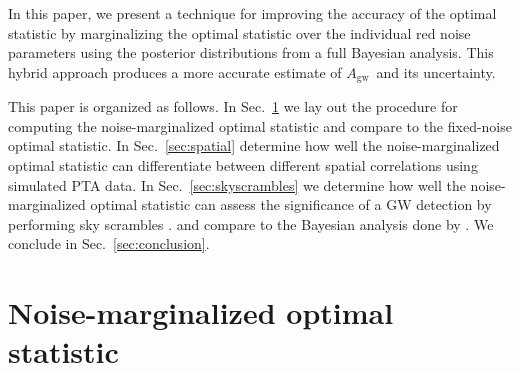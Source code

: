 \documentclass[twocolumn,aps,prd,superscriptaddress]{revtex4-1}
\newcommand{\Agw}{\ensuremath{A_\mathrm{gw}}}
\begin{document}
In this paper, we present a technique for improving the accuracy of the optimal statistic 
by marginalizing the optimal statistic over the individual red noise parameters 
using the posterior distributions from a full Bayesian analysis. 
This hybrid approach produces a more accurate 
estimate of \Agw\ and its uncertainty.

This paper is organized as follows. In Sec.~\ref{sec:marg_os} 
we lay out the procedure for computing the noise-marginalized optimal statistic 
and compare to the fixed-noise optimal statistic. 
In Sec.~\ref{sec:spatial} determine how well 
the noise-marginalized optimal statistic can 
differentiate between different spatial correlations 
using simulated PTA data. 
In Sec.~\ref{sec:skyscrambles} we determine how well the noise-marginalized optimal statistic 
can assess the significance of a GW detection by performing sky scrambles \citep{cs2016}. 
and compare to the Bayesian analysis done by \citet{tlb+2017}. 
We conclude in Sec.~\ref{sec:conclusion}.


\section{Noise-marginalized optimal statistic}
\label{sec:marg_os}
\end{document}
